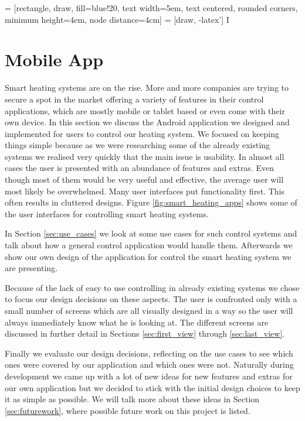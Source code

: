 
 = [rectangle, draw, fill=blue!20, 
    text width=5em, text centered, rounded corners, minimum height=4em, node distance=4cm]
 = [draw, -latex']
I
\chapter{Mobile App}
\label{sec:mobile_app}

Smart heating systems are on the rise. More and more companies are trying to secure a spot in the market offering a variety of features in their control applications, which are mostly mobile or tablet based or even come with their own device. In this section we discuss the Android application we designed and implemented for users to control our heating system. We focused on keeping things simple because as we were researching some of the already existing systems we realised very quickly that the main issue is usability. In almost all cases the user is presented with an abundance of features and extras. Even though most of them would be very useful and effective, the average user will most likely be overwhelmed. Many user interfaces put functionality first. This often results in cluttered designs. Figure \ref{fig:smart_heating_apps} shows some of the user interfaces for controlling smart heating systems.

In Section \ref{sec:use_cases} we look at some use cases for such control systems and talk about how a general control application would handle them. Afterwards we show our own design of the application for control the smart heating system we are presenting.

Because of the lack of easy to use controlling in already existing systems we chose to focus our design decisions on these aspects. The user is confronted only with a small number of screens which are all visually designed in a way so the user will always immediately know what he is looking at. The different screens are discussed in further detail in Sections \ref{sec:first_view} through \ref{sec:last_view}.

Finally we evaluate our design decisions, reflecting on the use cases to see which ones were covered by our application and which ones were not. Naturally during development we came up with a lot of new ideas for new features and extras for our own application but we decided to stick with the initial design choices to keep it as simple as possible. We will talk more about these ideas in Section \ref{sec:futurework}, where possible future work on this project is listed.

